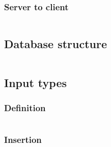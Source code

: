\documentclass{article}
\begin{document}
\subsubsection{Server to client}
\inputminted[fontsize=\tiny, linenos, breaklines]{json}{data-models/report-server-to-client.json}

\newpage
\subsection{Database structure}
\inputminted[fontsize=\tiny, linenos, breaklines]{json}{data-models/database-structure.json}

\newpage
\subsection{Input types}

\subsubsection{Definition}
\inputminted[fontsize=\tiny, linenos, breaklines]{json}{data-models/input-types-definition.json}

\subsubsection{Insertion}
\inputminted[fontsize=\tiny, linenos, breaklines]{json}{data-models/input-types-insertion.json}
\end{document}
